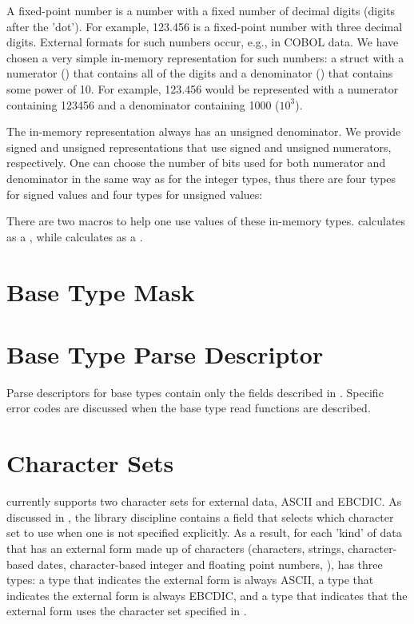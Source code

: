 A fixed-point number is a number with a fixed number of decimal digits
(digits after the 'dot').  For example, 123.456 is a fixed-point
number with three decimal digits.  External formats for such numbers
occur, e.g., in COBOL data.  We have chosen a very simple in-memory
representation for such numbers: a struct with a numerator ()
that contains all of the digits and a denominator () that
contains some power of 10.  For example, 123.456 would be represented
with a numerator containing 123456 and a denominator containing 1000 ($10^3$).

The in-memory representation always has an unsigned denominator. We
provide signed and unsigned representations that use signed and
unsigned numerators, respectively.  One can choose the number of bits
used for both numerator and denominator in the same way as for the
integer types, thus there are four types for signed values
and four types for unsigned values:


There are two macros to help one use values of these in-memory types.
 calculates  as a ,
while  calculates  as a .

\section{Base Type Mask}
\label{sec:base-type-mask}


\section{Base Type Parse Descriptor}
\label{sec:base-type-parse-descriptors}
Parse descriptors for base types contain only the fields described in 
.
Specific error codes are discussed when the base type read functions
are described.


\section{Character Sets}

\PADSL{} currently supports two character sets for external data, ASCII and EBCDIC.
As discussed in , the library
discipline contains a field
 that selects which character set to use when
one is not specified explicitly.  As a result, for each 'kind' of data
that has an external form made up of characters (characters, strings,
character-based dates, character-based integer and floating point
numbers, \etc{}), \PADSL{} has three types: a type that indicates the external
form is always ASCII, a type that indicates the external form is
always EBCDIC, and a type that indicates that the external form uses
the character set specified in .

